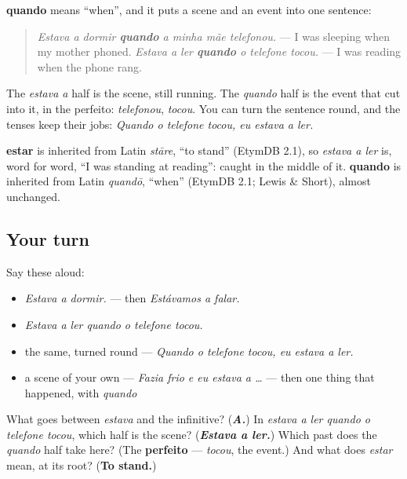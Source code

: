\begin{grammarlens}[title={Grammar Lens: quando, where the event comes in}]
\textbf{quando} means \textquotedblleft{}when\textquotedblright{}, and it puts a scene and an event into one sentence:

\begin{quote}
\emph{Estava a dormir \textbf{quando} a minha mãe telefonou.} — I was sleeping when my mother phoned. \emph{Estava a ler \textbf{quando} o telefone tocou.} — I was reading when the phone rang.
\end{quote}

The \emph{estava a} half is the scene, still running. The \emph{quando} half is the event that cut into it, in the perfeito: \emph{telefonou}, \emph{tocou}. You can turn the sentence round, and the tenses keep their jobs: \emph{Quando o telefone tocou, eu estava a ler.}
\end{grammarlens}

\begin{cousinweb}
\textbf{estar} is inherited from Latin \emph{stāre}, \textquotedblleft{}to stand\textquotedblright{} (EtymDB 2.1), so \emph{estava a ler} is, word for word, \textquotedblleft{}I was standing at reading\textquotedblright{}: caught in the middle of it. \textbf{quando} is inherited from Latin \emph{quandō}, \textquotedblleft{}when\textquotedblright{} (EtymDB 2.1; Lewis \& Short), almost unchanged.
\end{cousinweb}

\subsection*{Your turn}
Say these aloud:

\begin{itemize}
\raggedright
  \item \emph{Estava a dormir.} — then \emph{Estávamos a falar.}
  \item \emph{Estava a ler quando o telefone tocou.}
  \item the same, turned round — \emph{Quando o telefone tocou, eu estava a ler.}
  \item a scene of your own — \emph{Fazia frio e eu estava a …} — then one thing that happened, with \emph{quando}
\end{itemize}

\begin{tcolorbox}[breakable,colback=teal!4,colframe=teal!35!black,title={Before you move on}]
What goes between \emph{estava} and the infinitive? (\emph{\textbf{A.}}) In \emph{estava a ler quando o telefone tocou}, which half is the scene? (\emph{\textbf{Estava a ler.}}) Which past does the \emph{quando} half take here? (The \textbf{perfeito} — \emph{tocou}, the event.) And what does \emph{estar} mean, at its root? (\textbf{To stand.})
\end{tcolorbox}
